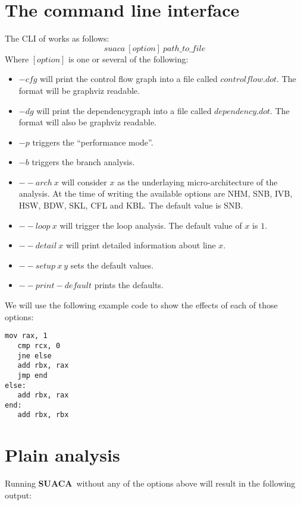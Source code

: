 \documentclass[a4paper,12pt,titlepage, twoside]{report}
\newcommand{\suaca}{\textbf{SUACA}}
\begin{document}
\section{The command line interface}
The CLI of works as follows:\\
\[
suaca\ [option]\ path\_to\_file
\]
Where $[option]$ is one or several of the following:
\begin{itemize}
    \item $-cfg$ will print the control flow graph into a file called $controlflow.dot$. The format will be graphviz readable.
    \item $-dg$ will print the dependencygraph into a file called $dependency.dot$. The format will also be graphviz readable.
    \item $-p$ triggers the ``performance mode''.
    \item $-b$ triggers the branch analysis.
    \item ${--}arch\ x$ will consider $x$ as the underlaying micro-architecture of the analysis. At the time of writing the available options are NHM, SNB, IVB, HSW, BDW, SKL, CFL and KBL. The default value is SNB.
    \item ${--}loop\ x$ will trigger the loop analysis. The default value of $x$ is $1$.
    \item ${--}detail\ x$ will print detailed information about line $x$.
    \item ${--}setup\ x\ y$ sets the default values.
    \item ${--}print-default$ prints the defaults.
\end{itemize}

We will use the following example code to show the effects of each of those options:

\begin{mdframed}[backgroundcolor=light-gray, roundcorner=10pt,leftmargin=1, rightmargin=1, innerleftmargin=15, innertopmargin=1,innerbottommargin=1, outerlinewidth=1, linecolor=light-gray]
\begin{lstlisting}[language={myLang}, basicstyle=\small]
   mov rax, 1
   cmp rcx, 0
   jne else
   add rbx, rax
   jmp end
else:
   add rbx, rax
end:
   add rbx, rbx
\end{lstlisting}
\end{mdframed}

\section{Plain analysis}
\label{sec:plain}
Running \suaca\ without any of the options above will result in the following output:
\end{document}
